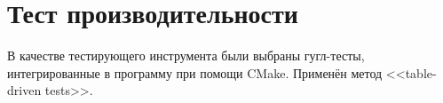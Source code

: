 \section{Тест производительности}

В качестве тестирующего инструмента были выбраны гугл-тесты, интегрированные в программу при помощи CMake. Применён метод <<table-driven tests>>.

\pagebreak

